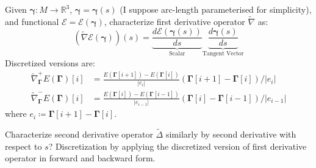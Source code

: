 \documentclass[a4paper]{article}
\newcommand{\gammabf}{\boldsymbol{\gamma}}
\newcommand{\Gammabf}{\boldsymbol{\Gamma}}
\newcommand{\curvenabla}{\tilde{\nabla}}
\newcommand{\curvelaplacian}{\tilde{\Delta}}
\begin{document}
Given $\gammabf:M \rightarrow \mathbb{R}^3$, $\gammabf = \gammabf(s)$ (I suppose arc-length parameterised for simplicity),
and functional $\mathcal{E} = \mathcal{E} \left( \gammabf \right)$,
characterize first derivative operator $\curvenabla$ as:
\begin{equation}
    \left( \curvenabla \mathcal{E} \left( \gammabf \right) \right) \left( s \right)
    =
    \underbrace{\frac{d \mathcal{E} \left( \gammabf \left( s \right) \right)}{ds}}_{\text{Scalar}}
    \underbrace{\frac{d \gammabf (s)}{d s}}_{\text{Tangent Vector}}
\end{equation}
Discretized versions are:
\begin{align}
    \curvenabla_{\Gammabf}^+ E \left( \Gammabf \right) \left[ i \right] &= \frac{E\left( \Gammabf\left[ i+1 \right] \right) - E\left( \Gammabf [i] \right)}{|e_i|} \left( \Gammabf\left[ i+1 \right] - \Gammabf\left[ i \right] \right)/|e_i| \\
    \curvenabla_{\Gammabf}^- E \left( \Gammabf \right) \left[ i \right] &= \frac{E\left( \Gammabf\left[ i \right] \right) - E\left( \Gammabf [i-1] \right)}{|e_{i-1}|} \left( \Gammabf\left[ i \right] - \Gammabf\left[ i-1 \right] \right)/|e_{i-1}|
\end{align}
where $e_i \coloneqq \Gammabf[i+1] - \Gammabf[i]$.

Characterize second derivative operator $\curvelaplacian$ similarly by second derivative with respect to $s$?
Discretization by applying the discretized version of first derivative operator in forward and backward form.
\end{document}
